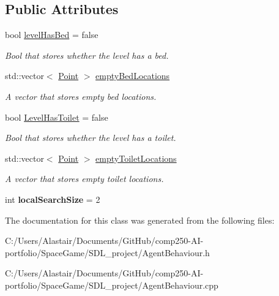 \subsection*{Public Attributes}
\begin{DoxyCompactItemize}
\item 
\mbox{\label{class_agent_behaviour_a2b26dafd1b01890c52803f19b18f846a}} 
bool \hyperlink{class_agent_behaviour_a2b26dafd1b01890c52803f19b18f846a}{level\+Has\+Bed} = false
\begin{DoxyCompactList}\small\item\em Bool that stores whether the level has a bed. \end{DoxyCompactList}\item 
\mbox{\label{class_agent_behaviour_a30450ea561add5573dffeb78b32e3bca}} 
std\+::vector$<$ \hyperlink{class_point}{Point} $>$ \hyperlink{class_agent_behaviour_a30450ea561add5573dffeb78b32e3bca}{empty\+Bed\+Locations}
\begin{DoxyCompactList}\small\item\em A vector that stores empty bed locations. \end{DoxyCompactList}\item 
\mbox{\label{class_agent_behaviour_af3def48bbce26581630f0f1cf3d2f67e}} 
bool \hyperlink{class_agent_behaviour_af3def48bbce26581630f0f1cf3d2f67e}{Level\+Has\+Toilet} = false
\begin{DoxyCompactList}\small\item\em Bool that stores whether the level has a toilet. \end{DoxyCompactList}\item 
\mbox{\label{class_agent_behaviour_ad2018440fabd1aaad74f6ce3c22c64f1}} 
std\+::vector$<$ \hyperlink{class_point}{Point} $>$ \hyperlink{class_agent_behaviour_ad2018440fabd1aaad74f6ce3c22c64f1}{empty\+Toilet\+Locations}
\begin{DoxyCompactList}\small\item\em A vector that stores empty toilet locations. \end{DoxyCompactList}\item 
\mbox{\label{class_agent_behaviour_ac541d443fc80b6c5d7758533d554648f}} 
int {\bfseries local\+Search\+Size} = 2
\end{DoxyCompactItemize}


The documentation for this class was generated from the following files\+:\begin{DoxyCompactItemize}
\item 
C\+:/\+Users/\+Alastair/\+Documents/\+Git\+Hub/comp250-\/\+A\+I-\/portfolio/\+Space\+Game/\+S\+D\+L\+\_\+project/Agent\+Behaviour.\+h\item 
C\+:/\+Users/\+Alastair/\+Documents/\+Git\+Hub/comp250-\/\+A\+I-\/portfolio/\+Space\+Game/\+S\+D\+L\+\_\+project/Agent\+Behaviour.\+cpp\end{DoxyCompactItemize}
